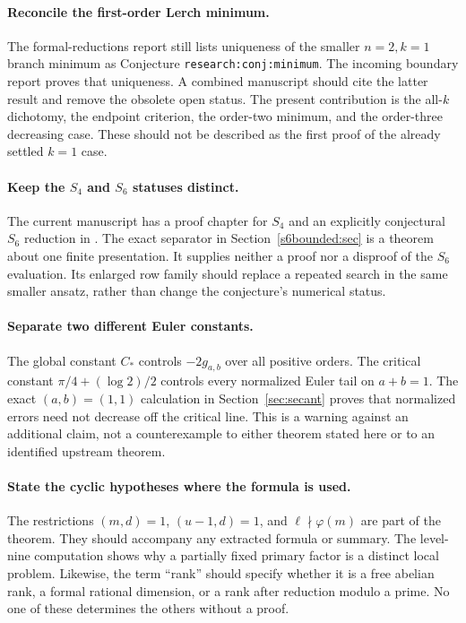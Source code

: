 \paragraph{Reconcile the first-order Lerch minimum.}
The formal-reductions report \cite{formalreductions} still lists
uniqueness of the smaller $n=2,k=1$ branch minimum as Conjecture
\texttt{research:conj:minimum}. The incoming boundary report
\cite{lershape:Boundary} proves that uniqueness. A combined manuscript
should cite the latter result and remove the obsolete open status.
The present contribution is the all-$k$ dichotomy, the endpoint
criterion, the order-two minimum, and the order-three decreasing
case. These should not be described as the first proof of the
already settled $k=1$ case.

\paragraph{Keep the $S_4$ and $S_6$ statuses distinct.}
The current manuscript has a proof chapter for $S_4$ and an explicitly
conjectural $S_6$ reduction in
. The exact separator in
Section~\ref{s6bounded:sec} is a theorem about one finite presentation.
It supplies neither a proof nor a disproof of the $S_6$ evaluation.
Its enlarged row family should replace a repeated search in the same
smaller ansatz, rather than change the conjecture's numerical status.

\paragraph{Separate two different Euler constants.}
The global constant $C_*$ controls $-2g_{a,b}$ over all positive orders.
The critical constant $\pi/4+(\log2)/2$ controls every normalized Euler
tail on $a+b=1$. The exact $(a,b)=(1,1)$ calculation in
Section~\ref{sec:secant} proves that normalized errors need not decrease
off the critical line. This is a warning against an additional claim,
not a counterexample to either theorem stated here or to an identified
upstream theorem.

\paragraph{State the cyclic hypotheses where the formula is used.}
The restrictions $(m,d)=1$, $(u-1,d)=1$, and
$\ell\nmid\varphi(m)$ are part of the theorem. They should accompany
any extracted formula or summary. The level-nine computation shows
why a partially fixed primary factor is a distinct local problem.
Likewise, the term ``rank'' should specify whether it is a free
abelian rank, a formal rational dimension, or a rank after reduction
modulo a prime. No one of these determines the others without a proof.

